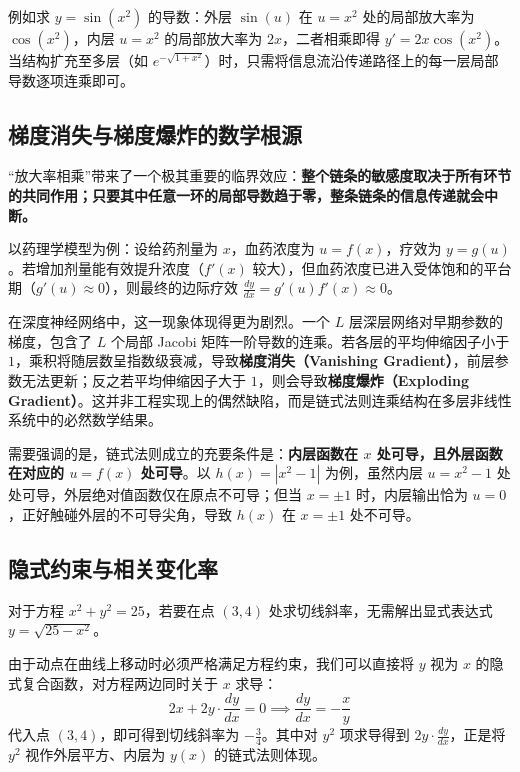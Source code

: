 例如求 \(y=\sin(x^2)\) 的导数：外层 \(\sin(u)\) 在 \(u=x^2\) 处的局部放大率为 \(\cos(x^2)\)，内层 \(u=x^2\) 的局部放大率为 \(2x\)，二者相乘即得 \(y'=2x\cos(x^2)\)。当结构扩充至多层（如 \(e^{-\sqrt{1+x^2}}\)）时，只需将信息流沿传递路径上的每一层局部导数逐项连乘即可。

\subsection{梯度消失与梯度爆炸的数学根源}

``放大率相乘''带来了一个极其重要的临界效应：\textbf{整个链条的敏感度取决于所有环节的共同作用；只要其中任意一环的局部导数趋于零，整条链条的信息传递就会中断。}

以药理学模型为例：设给药剂量为 \(x\)，血药浓度为 \(u=f(x)\)，疗效为 \(y=g(u)\)。若增加剂量能有效提升浓度（\(f'(x)\) 较大），但血药浓度已进入受体饱和的平台期（\(g'(u)\approx 0\)），则最终的边际疗效 \(\frac{dy}{dx}=g'(u)f'(x)\approx 0\)。

在深度神经网络中，这一现象体现得更为剧烈。一个 \(L\) 层深层网络对早期参数的梯度，包含了 \(L\) 个局部 Jacobi 矩阵一阶导数的连乘。若各层的平均伸缩因子小于 \(1\)，乘积将随层数呈指数级衰减，导致\textbf{梯度消失（Vanishing Gradient）}，前层参数无法更新；反之若平均伸缩因子大于 \(1\)，则会导致\textbf{梯度爆炸（Exploding Gradient）}。这并非工程实现上的偶然缺陷，而是链式法则连乘结构在多层非线性系统中的必然数学结果。

需要强调的是，链式法则成立的充要条件是：\textbf{内层函数在 \(x\) 处可导，且外层函数在对应的 \(u=f(x)\) 处可导}。以 \(h(x)=|x^2-1|\) 为例，虽然内层 \(u=x^2-1\) 处处可导，外层绝对值函数仅在原点不可导；但当 \(x=\pm 1\) 时，内层输出恰为 \(u=0\)，正好触碰外层的不可导尖角，导致 \(h(x)\) 在 \(x=\pm 1\) 处不可导。

\subsection{隐式约束与相关变化率}

对于方程 \(x^2+y^2=25\)，若要在点 \((3,4)\) 处求切线斜率，无需解出显式表达式 \(y=\sqrt{25-x^2}\)。

由于动点在曲线上移动时必须严格满足方程约束，我们可以直接将 \(y\) 视为 \(x\) 的隐式复合函数，对方程两边同时关于 \(x\) 求导：
\[
2x+2y\cdot\frac{dy}{dx}=0 \implies \frac{dy}{dx}=-\frac{x}{y}
\]
代入点 \((3,4)\)，即可得到切线斜率为 \(-\frac{3}{4}\)。其中对 \(y^2\) 项求导得到 \(2y\cdot\frac{dy}{dx}\)，正是将 \(y^2\) 视作外层平方、内层为 \(y(x)\) 的链式法则体现。

